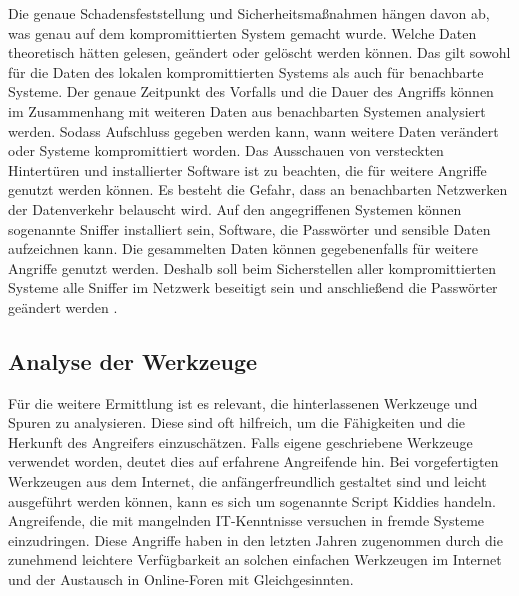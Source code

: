 \documentclass[12pt,DIV=14, version=first, BCOR=10mm,a4paper,twoside,parskip=half-,headsepline,headinclude]{scrartcl}
\begin{document}
    Die genaue Schadensfeststellung und Sicherheitsmaßnahmen hängen davon ab, was genau auf dem kompromittierten System gemacht wurde. Welche Daten theoretisch hätten gelesen, geändert oder gelöscht werden können. Das gilt sowohl für die Daten des lokalen kompromittierten Systems als auch für benachbarte Systeme. Der genaue Zeitpunkt des Vorfalls und die Dauer des Angriffs können im Zusammenhang mit weiteren Daten aus benachbarten Systemen analysiert werden. Sodass Aufschluss gegeben werden kann, wann weitere Daten verändert oder Systeme kompromittiert worden. Das Ausschauen von versteckten Hintertüren und installierter Software ist zu beachten, die für weitere Angriffe genutzt werden können. Es besteht die Gefahr, dass an benachbarten Netzwerken der Datenverkehr belauscht wird. Auf den angegriffenen Systemen können sogenannte Sniffer installiert sein, Software, die Passwörter und sensible Daten aufzeichnen kann. Die gesammelten Daten können gegebenenfalls für weitere Angriffe genutzt werden. Deshalb soll beim Sicherstellen aller kompromittierten Systeme alle Sniffer im Netzwerk beseitigt sein und anschließend die Passwörter geändert werden \cite[vgl. S. 71-72]{texbook01}. 
    
    \subsection{Analyse der Werkzeuge}
    Für die weitere Ermittlung ist es relevant, die hinterlassenen Werkzeuge und Spuren zu analysieren. Diese sind oft hilfreich, um die Fähigkeiten und die Herkunft des Angreifers einzuschätzen. Falls eigene geschriebene Werkzeuge verwendet worden, deutet dies auf erfahrene Angreifende hin. Bei vorgefertigten Werkzeugen aus dem Internet, die anfängerfreundlich gestaltet sind und leicht ausgeführt werden können, kann es sich um sogenannte Script Kiddies handeln. Angreifende, die mit mangelnden IT-Kenntnisse versuchen in fremde Systeme einzudringen. Diese Angriffe haben in den letzten Jahren zugenommen durch die zunehmend leichtere Verfügbarkeit an solchen einfachen Werkzeugen im Internet und der Austausch in Online-Foren mit Gleichgesinnten.
    
\end{document}
